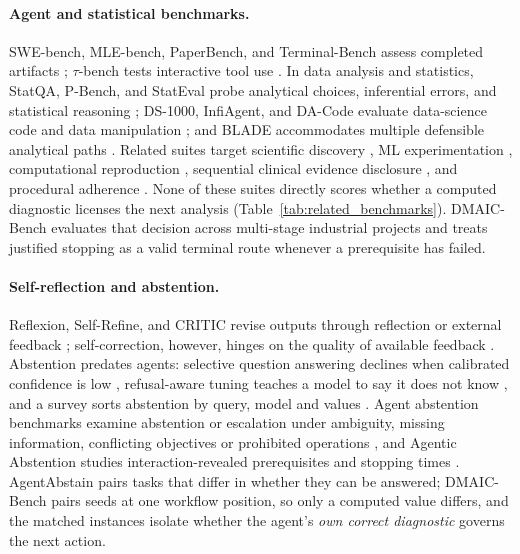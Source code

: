 \documentclass{article}
\begin{document}
\paragraph{Agent and statistical benchmarks.}
SWE-bench, MLE-bench, PaperBench, and Terminal-Bench assess completed artifacts \citep{jimenez2024swebench,chan2025mlebench,starace2025paperbench,merrill2026terminalbench}; $\tau$-bench tests interactive tool use \citep{yao2024taubench,yao2025tau2bench}. In data analysis and statistics, StatQA, P-Bench, and StatEval probe analytical choices, inferential errors, and statistical reasoning \citep{zhu2024statqa,miao2026fisher,lu2025stateval}; DS-1000, InfiAgent, and DA-Code evaluate data-science code and data manipulation \citep{lai2023ds1000,hu2024infiagent,huang2024dacode}; and BLADE accommodates multiple defensible analytical paths \citep{gu2024blade}. Related suites target scientific discovery \citep{majumder2025discoverybench,chen2025scienceagentbench}, ML experimentation \citep{huang2024mlagentbench}, computational reproduction \citep{siegel2024corebench}, sequential clinical evidence disclosure \citep{nori2025sdbench}, and procedural adherence \citep{nandi2026sopbench,chen2026chibench}. None of these suites directly scores whether a computed diagnostic licenses the next analysis (Table~\ref{tab:related_benchmarks}). DMAIC-Bench evaluates that decision across multi-stage industrial projects and treats justified stopping as a valid terminal route whenever a prerequisite has failed. 

\paragraph{Self-reflection and abstention.}
Reflexion, Self-Refine, and CRITIC revise outputs through reflection or external feedback \citep{shinn2023reflexion,madaan2023selfrefine,gou2024critic}; self-correction, however, hinges on the quality of available feedback \citep{huang2024cannot,kamoi2024when}. Abstention predates agents: selective question answering declines when calibrated confidence is low \citep{kamath2020selective}, refusal-aware tuning teaches a model to say it does not know \citep{zhang2024rtuning}, and a survey sorts abstention by query, model and values \citep{wen2025knowyourlimits}. Agent abstention benchmarks examine abstention or escalation under ambiguity, missing information, conflicting objectives or prohibited operations \citep{liu2026agentabstain,trinh2026hilbench,huang2026conflictgui,asif2026blindspot}, and Agentic Abstention studies interaction-revealed prerequisites and stopping times \citep{luo2026agenticabstention}. AgentAbstain pairs tasks that differ in whether they can be answered; DMAIC-Bench pairs seeds at one workflow position, so only a computed value differs, and the matched instances isolate whether the agent's \emph{own correct diagnostic} governs the next action.
\end{document}

